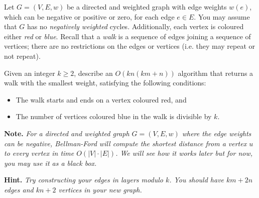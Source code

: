 \documentclass{article}
\begin{document}
\begin{question}
Let $G = (V, E, w)$ be a directed and weighted graph with edge weights $w(e)$, which can be negative or positive or zero, for each edge $e \in E$. You may assume that $G$ has no {\em negatively weighted} cycles. Additionally, each vertex is coloured either {\em red} or {\em blue}. Recall that a {\em walk} is a sequence of edges joining a sequence of vertices; there are no restrictions on the edges or vertices (i.e. they may repeat or not repeat).

Given an integer $k \geq 2$, describe an $O(kn(km + n))$ algorithm that returns a walk with the smallest weight, satisfying the following conditions:
\begin{itemize}
    \item The walk starts and ends on a vertex coloured red, and
    \item The number of vertices coloured blue in the walk is divisible by $k$.
\end{itemize}

{\bfseries Note.} {\em For a directed and weighted graph $G = (V, E, w)$ where the edge weights can be negative, Bellman-Ford will compute the shortest distance from a vertex $u$ to every vertex in time $O(\lvert V \rvert \cdot \lvert E \rvert)$. We will see how it works later but for now, you may use it as a black box.}

{\bfseries Hint.} {\em Try constructing your edges in layers modulo $k$. You should have $km + 2n$ edges and $kn + 2$ vertices in your new graph.}
\end{question}
\end{document}
